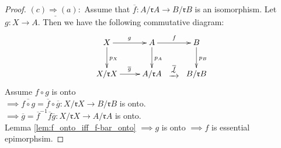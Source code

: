 \begin{prop}
\begin{proof}
$\underline{(c) \Rightarrow (a):}$ Assume that $\overline{f}\colon
A/\mathfrak{r}A \to B / \mathfrak{r}B$ is an isomorphism. Let $g\colon X
\to A$. Then we have the following commutative diagram:
$$\xymatrix{
X\ar[r]^g \ar[d]^{p_X} & A\ar[r]^f \ar[d]^{p_A} & B \ar[d]^{p_B}\\
X /\mathfrak{r} X \ar[r]^{\overline{g}} & A/\mathfrak{r}A\ar@{}[r]|-*[@]{\xrightarrow{\sim}}^{\overline{f}} & B/\mathfrak{r}B\\
}$$
Assume $f \circ g$ is onto\\ $\implies \overline{f \circ g} =
\overline{f} \circ \overline{g}\colon X /\mathfrak{r} X \to B /\mathfrak{r} B$ is onto.\\ 
$\implies \overline{g} =
\overline{f}^{-1}\overline{f}\overline{g}\colon X /\mathfrak{r} X \to A /\mathfrak{r} A$ is onto.\\ 
Lemma \ref{lem:f_onto_iff_f-bar_onto} $\implies g$ is onto $\implies f$ is essential epimorphsim.
\end{proof}
\end{prop}

